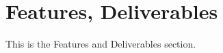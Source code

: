 \documentclass[proposal.tex]{subfiles}
\begin{document}
    
\section{Features, Deliverables}

This is the Features and Deliverables section.
\end{document}
